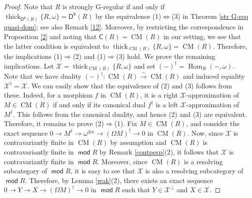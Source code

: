 \documentclass{amsart}
\theoremstyle{definition}
\theoremstyle{remark}
\numberwithin{equation}{thm}
\def\c{\mathsf{C}}
\def\cm{\operatorname{CM}}
\def\Db{\operatorname{\mathsf{D^b}}}
\def\Hom{\operatorname{Hom}}
\def\mod{\operatorname{\mathsf{mod}}}
\def\thick{\operatorname{thick}}
\def\X{\mathcal{X}}
\begin{document}
\begin{proof}
Note that $R$ is strongly G-regular if and only if $\thick_{\Db(R)}\{R,\omega\}=\Db(R)$ by the equivalence (1)$\Leftrightarrow$(3) in Theorem \ref{str G-req quasi-dom}; see also Remark \ref{12}.
Moreover, by restricting the correspondence in Proposition \ref{2} and noting that $\c(R)=\cm(R)$ in our setting, we see that the latter condition is equivalent to $\thick_{\cm(R)}\{R,\omega\}=\cm(R)$.
Therefore, the implications (1)$\Rightarrow$(2) and (1)$\Rightarrow$(3) hold.
We prove the remaining implications.
Let $\X=\thick_{\cm(R)}\{R,\omega\}$ and set $(-)^\dagger=\Hom_R(-,\omega)$.
Note that we have duality $(-)^\dagger:\cm(R)\xrightarrow{\sim}\cm(R)$ and induced equality $\X^\dagger=\X$.
We can easily show that the equivalence of (2) and (3) follows from these.
Indeed, for a morphism $f$ in $\cm(R)$, it is a right $\X$-approximation of $M\in\cm(R)$ if and only if its canonical dual $f^\dagger$ is a left $\X$-approximation of $M^\dagger$.
This follows from the canonical duality, and hence (2) and (3) are equivalent.
Therefore, it remains to prove (2)$\Rightarrow$(1).
Fix $M\in\cm(R)$, and consider the exact sequence $0\to M^\dagger\to \omega^{\oplus n}\to(\Omega M)^\dagger\to 0$
in $\cm(R)$.
Now, since $\X$ is contravariantly finite in $\cm(R)$ by assumption and $\cm(R)$ is contravariantly finite in $\mod R$ by Remark \ref{contperp}(2), it follows that $\X$ is contravariantly finite in $\mod R$. Moreover, since $\cm(R)$ is a resolving subcategory of $\mod R$, it is easy to see that $\X$ is also a resolving subcategory of $\mod R$.
Therefore, by Lemma \ref{wak}(2), there exists an exact sequence $0\to Y\to X\to(\Omega M)^\dagger\to 0$ in $\mod R$ such that $Y\in\X^\perp$ and $X\in\X$.

\end{proof}
\end{document}
